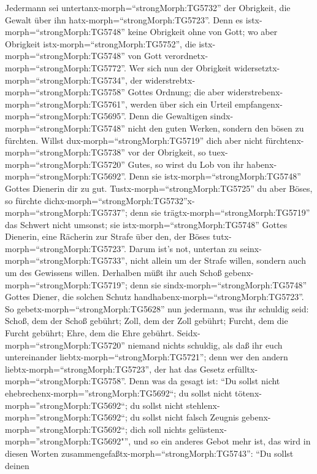  Jedermann sei untertanx-morph=``strongMorph:TG5732'' der
Obrigkeit, die Gewalt über ihn hatx-morph=``strongMorph:TG5723''. Denn
es istx-morph=``strongMorph:TG5748'' keine Obrigkeit ohne von Gott; wo
aber Obrigkeit istx-morph=``strongMorph:TG5752'', die
istx-morph=``strongMorph:TG5748'' von Gott
verordnetx-morph=``strongMorph:TG5772''.  Wer sich nun der
Obrigkeit widersetztx-morph=``strongMorph:TG5734'', der
widerstrebtx-morph=``strongMorph:TG5758'' Gottes Ordnung; die aber
widerstrebenx-morph=``strongMorph:TG5761'', werden über sich ein Urteil
empfangenx-morph=``strongMorph:TG5695''.  Denn die
Gewaltigen sindx-morph=``strongMorph:TG5748'' nicht den guten Werken,
sondern den bösen zu fürchten. Willst dux-morph=``strongMorph:TG5719''
dich aber nicht fürchtenx-morph=``strongMorph:TG5738'' vor der
Obrigkeit, so tuex-morph=``strongMorph:TG5720'' Gutes, so wirst du Lob
von ihr habenx-morph=``strongMorph:TG5692''.  Denn sie
istx-morph=``strongMorph:TG5748'' Gottes Dienerin dir zu gut.
Tustx-morph=``strongMorph:TG5725'' du aber Böses, so fürchte
dichx-morph=``strongMorph:TG5732''\textbar x-morph=``strongMorph:TG5737'';
denn sie trägtx-morph=``strongMorph:TG5719'' das Schwert nicht umsonst;
sie istx-morph=``strongMorph:TG5748'' Gottes Dienerin, eine Rächerin zur
Strafe über den, der Böses tutx-morph=``strongMorph:TG5723''.
 Darum ist's not, untertan zu
seinx-morph=``strongMorph:TG5733'', nicht allein um der Strafe willen,
sondern auch um des Gewissens willen.  Derhalben müßt ihr
auch Schoß gebenx-morph=``strongMorph:TG5719''; denn sie
sindx-morph=``strongMorph:TG5748'' Gottes Diener, die solchen Schutz
handhabenx-morph=``strongMorph:TG5723''.  So
gebetx-morph=``strongMorph:TG5628'' nun jedermann, was ihr schuldig
seid: Schoß, dem der Schoß gebührt; Zoll, dem der Zoll gebührt; Furcht,
dem die Furcht gebührt; Ehre, dem die Ehre gebührt. 
Seidx-morph=``strongMorph:TG5720'' niemand nichts schuldig, als daß ihr
euch untereinander liebtx-morph=``strongMorph:TG5721''; denn wer den
andern liebtx-morph=``strongMorph:TG5723'', der hat das Gesetz
erfülltx-morph=``strongMorph:TG5758''.  Denn was da gesagt
ist: ``Du sollst nicht ehebrechenx-morph=''strongMorph:TG5692``; du
sollst nicht tötenx-morph=''strongMorph:TG5692``; du sollst nicht
stehlenx-morph=''strongMorph:TG5692``; du sollst nicht falsch Zeugnis
gebenx-morph=''strongMorph:TG5692``; dich soll nichts
gelüstenx-morph=''strongMorph:TG5692"'', und so ein anderes Gebot mehr
ist, das wird in diesen Worten
zusammengefaßtx-morph=``strongMorph:TG5743'': ``Du sollst deinen
